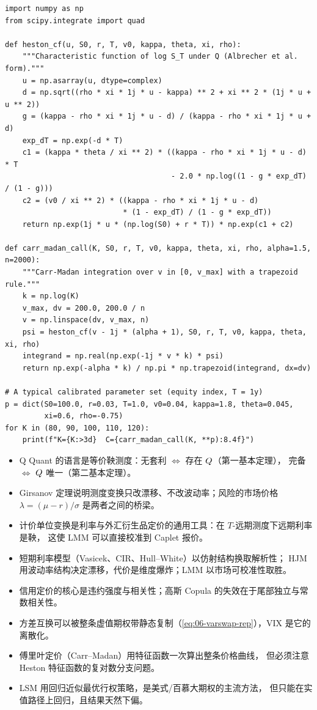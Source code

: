 \begin{lstlisting}[style=pythonstyle, caption={Heston 特征函数与 Carr-Madan 数值积分}, label={lst:06-heston}]
import numpy as np
from scipy.integrate import quad

def heston_cf(u, S0, r, T, v0, kappa, theta, xi, rho):
    """Characteristic function of log S_T under Q (Albrecher et al. form)."""
    u = np.asarray(u, dtype=complex)
    d = np.sqrt((rho * xi * 1j * u - kappa) ** 2 + xi ** 2 * (1j * u + u ** 2))
    g = (kappa - rho * xi * 1j * u - d) / (kappa - rho * xi * 1j * u + d)
    exp_dT = np.exp(-d * T)
    c1 = (kappa * theta / xi ** 2) * ((kappa - rho * xi * 1j * u - d) * T
                                      - 2.0 * np.log((1 - g * exp_dT) / (1 - g)))
    c2 = (v0 / xi ** 2) * ((kappa - rho * xi * 1j * u - d)
                           * (1 - exp_dT) / (1 - g * exp_dT))
    return np.exp(1j * u * (np.log(S0) + r * T)) * np.exp(c1 + c2)

def carr_madan_call(K, S0, r, T, v0, kappa, theta, xi, rho, alpha=1.5, n=2000):
    """Carr-Madan integration over v in [0, v_max] with a trapezoid rule."""
    k = np.log(K)
    v_max, dv = 200.0, 200.0 / n
    v = np.linspace(dv, v_max, n)
    psi = heston_cf(v - 1j * (alpha + 1), S0, r, T, v0, kappa, theta, xi, rho)
    integrand = np.real(np.exp(-1j * v * k) * psi)
    return np.exp(-alpha * k) / np.pi * np.trapezoid(integrand, dx=dv)

# A typical calibrated parameter set (equity index, T = 1y)
p = dict(S0=100.0, r=0.03, T=1.0, v0=0.04, kappa=1.8, theta=0.045,
         xi=0.6, rho=-0.75)
for K in (80, 90, 100, 110, 120):
    print(f"K={K:>3d}  C={carr_madan_call(K, **p):8.4f}")
\end{lstlisting}

\begin{summarybox}
\begin{itemize}[leftmargin=1.4em]
  \item Q Quant 的语言是等价鞅测度：无套利 $\iff$ 存在 $Q$（第一基本定理），
        完备 $\iff$ $Q$ 唯一（第二基本定理）。
  \item Girsanov 定理说明测度变换只改漂移、不改波动率；风险的市场价格
        $\lambda=(\mu-r)/\sigma$ 是两者之间的桥梁。
  \item 计价单位变换是利率与外汇衍生品定价的通用工具：在 $T$-远期测度下远期利率是鞅，
        这使 LMM 可以直接校准到 Caplet 报价。
  \item 短期利率模型（Vasicek、CIR、Hull--White）以仿射结构换取解析性；
        HJM 用波动率结构决定漂移，代价是维度爆炸；LMM 以市场可校准性取胜。
  \item 信用定价的核心是违约强度与相关性；高斯 Copula 的失效在于尾部独立与常数相关性。
  \item 方差互换可以被整条虚值期权带静态复制（\cref{eq:06-varswap-rep}），VIX 是它的离散化。
  \item 傅里叶定价（Carr--Madan）用特征函数一次算出整条价格曲线，
        但必须注意 Heston 特征函数的复对数分支问题。
  \item LSM 用回归近似最优行权策略，是美式/百慕大期权的主流方法，
        但只能在实值路径上回归，且结果天然下偏。
\end{itemize}
\end{summarybox}

